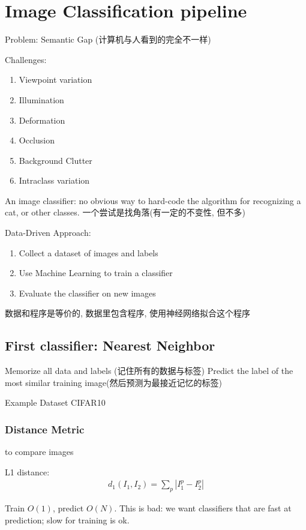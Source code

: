 \newpage
\section{Image Classification pipeline}

Problem: Semantic Gap (计算机与人看到的完全不一样)

Challenges:
\begin{enumerate}
    \item Viewpoint variation
    \item Illumination
    \item Deformation
    \item Occlusion
    \item Background Clutter
    \item Intraclass variation
\end{enumerate}

An image classifier: 
no obvious way to hard-code the algorithm for recognizing a cat, or other classes. 一个尝试是找角落(有一定的不变性, 但不多)

Data-Driven Approach:
\begin{enumerate}
    \item Collect a dataset of images and labels
    \item Use Machine Learning to train a classifier
    \item Evaluate the classifier on new images
\end{enumerate}
数据和程序是等价的, 数据里包含程序, 使用神经网络拟合这个程序

\subsection{First classifier: Nearest Neighbor}
Memorize all data and labels (记住所有的数据与标签)
Predict the label of the most similar training image(然后预测为最接近记忆的标签)

Example Dataset CIFAR10 
\subsubsection{Distance Metric} to compare images 

L1 distance:
\begin{align*}
    d_1(I_1, I_2)=\sum_p |I_1^p -I_2^p|
\end{align*}

Train $O(1)$, predict $O(N)$. This is bad: we want classifiers that are fast at prediction; slow for training is ok. 


